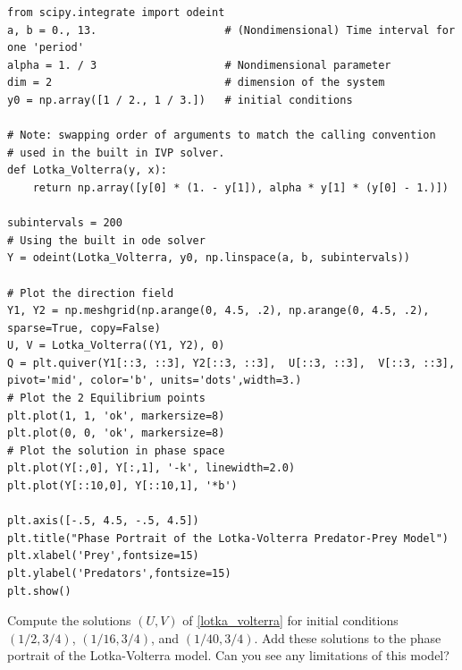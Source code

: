 \begin{lstlisting}
from scipy.integrate import odeint
a, b = 0., 13.                    # (Nondimensional) Time interval for one 'period'
alpha = 1. / 3                    # Nondimensional parameter
dim = 2                           # dimension of the system
y0 = np.array([1 / 2., 1 / 3.])   # initial conditions

# Note: swapping order of arguments to match the calling convention
# used in the built in IVP solver.
def Lotka_Volterra(y, x):
    return np.array([y[0] * (1. - y[1]), alpha * y[1] * (y[0] - 1.)])

subintervals = 200
# Using the built in ode solver
Y = odeint(Lotka_Volterra, y0, np.linspace(a, b, subintervals))

# Plot the direction field
Y1, Y2 = np.meshgrid(np.arange(0, 4.5, .2), np.arange(0, 4.5, .2), sparse=True, copy=False)
U, V = Lotka_Volterra((Y1, Y2), 0)
Q = plt.quiver(Y1[::3, ::3], Y2[::3, ::3],  U[::3, ::3],  V[::3, ::3], pivot='mid', color='b', units='dots',width=3.)
# Plot the 2 Equilibrium points
plt.plot(1, 1, 'ok', markersize=8)
plt.plot(0, 0, 'ok', markersize=8)
# Plot the solution in phase space
plt.plot(Y[:,0], Y[:,1], '-k', linewidth=2.0)
plt.plot(Y[::10,0], Y[::10,1], '*b')

plt.axis([-.5, 4.5, -.5, 4.5])
plt.title("Phase Portrait of the Lotka-Volterra Predator-Prey Model")
plt.xlabel('Prey',fontsize=15)
plt.ylabel('Predators',fontsize=15)
plt.show()
\end{lstlisting}

\begin{problem}
Compute the solutions $(U,V)$ of \eqref{lotka_volterra} 
for initial conditions $(1/2, 3/4)$, $(1/16, 3/4)$, and $(1/40, 3/4)$.
Add these solutions to the phase portrait of the Lotka-Volterra model.
Can you see any limitations of this model?
\end{problem}

